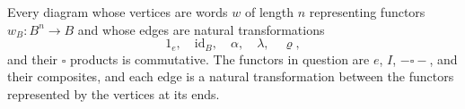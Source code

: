 Every diagram whose vertices are words $w$ of length $n$ representing functors $w_B : B^n \rightarrow B$ and whose edges are natural transformations
$$
1_e,\quad \text{id}_B,\quad \alpha,\quad \lambda,\quad \varrho,
$$
and their $\square$ products is commutative. The functors in question are $e$, $I$, $-\square-$, and their composites, and each edge is a natural transformation between the functors represented by the vertices at its ends.
